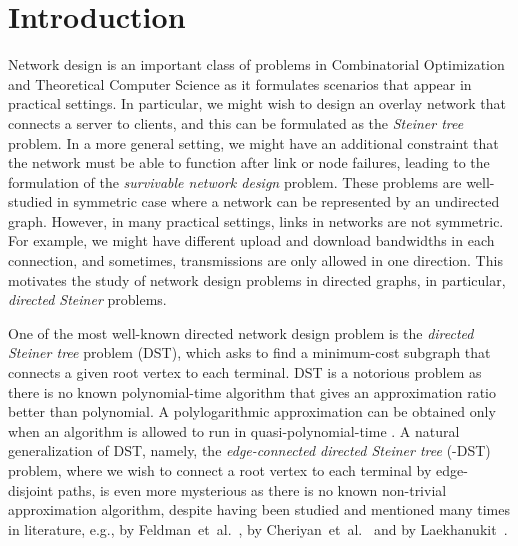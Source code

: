 \documentclass[11pt]{article}
\theoremstyle{definition}
\theoremstyle{remark}
\begin{document}
\section{Introduction}
\label{sec:intro}

Network design is an important class of problems in Combinatorial
Optimization and Theoretical Computer Science as 
it formulates scenarios that appear in practical settings. 
In particular, we might wish to design an overlay network that
connects a server to clients, and this can be formulated as 
the {\em Steiner tree} problem.
In a more general setting, we might have an additional constraint
that the network must be able to function after 
link or node failures, leading to 
the formulation of the {\em survivable network design} problem. 
These problems are well-studied in symmetric case
where a network can be represented by an undirected graph. 
However, in many practical settings,
links in networks are not symmetric.
For example, we might have different upload and download bandwidths in
each connection, and sometimes, transmissions are only allowed in one
direction.
This motivates the study of network design problems in directed
graphs, in particular, {\em directed Steiner} problems.

One of the most well-known directed network design problem 
is the {\em directed Steiner tree} problem (DST), which asks to find a
minimum-cost subgraph that connects a given root vertex to each
terminal.
DST is a notorious problem as there is no known polynomial-time
algorithm that gives an approximation ratio better than polynomial. 
A polylogarithmic approximation can be obtained only when an algorithm
is allowed to run in quasi-polynomial-time
\cite{CharikarCCDGGL99,Rothvoss11,FriggstadKKLST14}.
A natural generalization of DST, namely, 
the {\em  edge-connected directed Steiner tree} (-DST) problem,
where we wish to connect a root vertex to each terminal by 
edge-disjoint paths, is even more mysterious as there is no known
non-trivial approximation algorithm, despite having been studied and
mentioned many times in literature, e.g., 
by Feldman~et~al.~\cite{FeldmanKN12}, 
by Cheriyan~et~al.~\cite{CheriyanLNV14}
and by Laekhanukit~\cite{Laekhanukit14}. 
\end{document}

